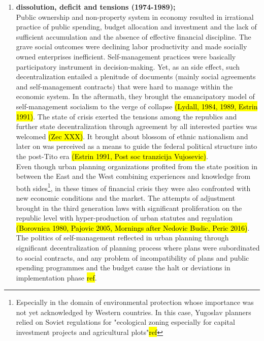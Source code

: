 \documentclass[11pt]{report}
\begin{document}
\begin{enumerate}
\item \textbf{dissolution, deficit and tensions (1974-1989);}
\\
Public ownership and non-property system in economy resulted in irrational practice of public spending, budget allocation and investment and the lack of sufficient accumulation and the  absence  of  effective  financial  discipline.
The grave social outcomes were declining labor productivity and made socially owned enterprises inefficient.
Self-management practices were basically participatory instrument in decision-making. Yet, as an side effect, such decentralization entailed a plenitude of documents (mainly social agreements and self-management contracts) that were hard to manage within the economic system.
In the aftermath, they brought the emancipatory model of self-management socialism to the verge of collapse \hl{(Lydall,  1984, 1989, Estrin 1991)}.
The state of crisis exerted the tensions among the republics and further state decentralization through  agreement  by  all  interested parties was welcomed \hl{(Zec XXX)}. It brought about blossom of ethnic nationalism and later on was perceived as a means to guide  the  federal  political  structure  into  the post-Tito era \hl{(Estrin 1991, Post soc tranzicija Vujosevic)}.
\\
Even though urban planning organizations profited from the state position in between the East and the West combining experiences and knowledge from both sides\footnote{Especially in the domain of environmental protection whose importance was not yet acknowledged by Western countries. In this case, Yugoslav planners relied on Soviet regulations for "ecological zoning especially for capital investment projects and agricultural plots"\hl{ref}}, in these times of financial crisis they were also confronted with new economic conditions and the market.
The attempts of adjustment brought in the third generation laws with significant proliferation on the republic level with hyper-production of urban statutes and regulation \hl{(Borovnica 1980, Pajovic 2005, Mornings after Nedovic Budic, Peric 2016)}.
The politics of self-management reflected in urban planning through significant decentralization of planning process where plans were subordinated to social contracts, and any problem of incompatibility of plans and public spending programmes and the budget cause the halt or deviations in implementation phase \hl{ref}.


\end{enumerate}
\end{document}
